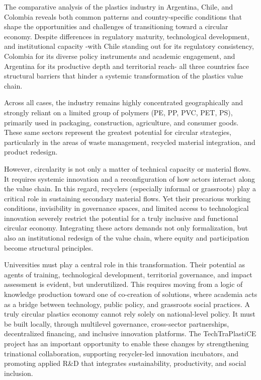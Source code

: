 \documentclass[
  12pt,
  oneside]{book}
\begin{document}
The comparative analysis of the plastics industry in Argentina, Chile,
and Colombia reveals both common patterns and country-specific
conditions that shape the opportunities and challenges of transitioning
toward a circular economy. Despite differences in regulatory maturity,
technological development, and institutional capacity -with Chile
standing out for its regulatory consistency, Colombia for its diverse
policy instruments and academic engagement, and Argentina for its
productive depth and territorial reach- all three countries face
structural barriers that hinder a systemic transformation of the
plastics value chain.

Across all cases, the industry remains highly concentrated
geographically and strongly reliant on a limited group of polymers (PE,
PP, PVC, PET, PS), primarily used in packaging, construction,
agriculture, and consumer goods. These same sectors represent the
greatest potential for circular strategies, particularly in the areas of
waste management, recycled material integration, and product redesign.

However, circularity is not only a matter of technical capacity or
material flows. It requires systemic innovation and a reconfiguration of
how actors interact along the value chain. In this regard, recyclers
(especially informal or grassroots) play a critical role in sustaining
secondary material flows. Yet their precarious working conditions,
invisibility in governance spaces, and limited access to technological
innovation severely restrict the potential for a truly inclusive and
functional circular economy. Integrating these actors demands not only
formalization, but also an institutional redesign of the value chain,
where equity and participation become structural principles.

Universities must play a central role in this transformation. Their
potential as agents of training, technological development, territorial
governance, and impact assessment is evident, but underutilized. This
requires moving from a logic of knowledge production toward one of
co-creation of solutions, where academia acts as a bridge between
technology, public policy, and grassroots social practices. A truly
circular plastics economy cannot rely solely on national-level policy.
It must be built locally, through multilevel governance, cross-sector
partnerships, decentralized financing, and inclusive innovation
platforms. The TechTraPlastiCE project has an important opportunity to
enable these changes by strengthening trinational collaboration,
supporting recycler-led innovation incubators, and promoting applied
R\&D that integrates sustainability, productivity, and social inclusion.
\end{document}
